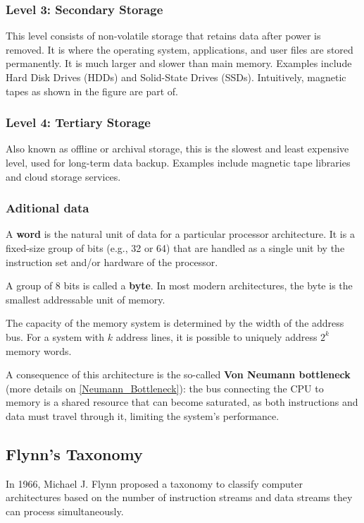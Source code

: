 \subsubsection{Level 3: Secondary Storage}
This level consists of non-volatile storage that retains data after power is removed. It is where the operating system, applications, and user files are stored permanently. It is much larger and slower than main memory. Examples include Hard Disk Drives (HDDs) and Solid-State Drives (SSDs). Intuitively, magnetic tapes as shown in the figure are part of.

\subsubsection{Level 4: Tertiary Storage}
Also known as offline or archival storage, this is the slowest and least expensive level, used for long-term data backup. Examples include magnetic tape libraries and cloud storage services.

\subsubsection*{Aditional data}
\begin{definition}
    \item[Word] A \textbf{word} is the natural unit of data for a particular processor architecture. It is a fixed-size group of bits (e.g., 32 or 64) that are handled as a single unit by the instruction set and/or hardware of the processor.
    
    \item[Byte] A group of 8 bits is called a \textbf{byte}. In most modern architectures, the byte is the smallest addressable unit of memory.
    
    \item[Addressability] The capacity of the memory system is determined by the width of the address bus. For a system with $k$ address lines, it is possible to uniquely address $2^k$ memory words.
\end{definition}

A consequence of this architecture is the so-called \textbf{Von Neumann bottleneck} (more details on \ref{Neumann_Bottleneck}): the bus connecting the CPU to memory is a shared resource that can become saturated, as both instructions and data must travel through it, limiting the system's performance.

\subsection{Flynn's Taxonomy}
In 1966, Michael J. Flynn proposed a taxonomy to classify computer architectures based on the number of instruction streams and data streams they can process simultaneously.

